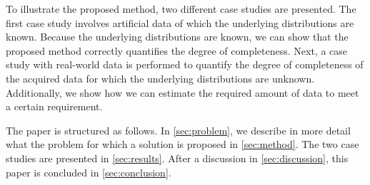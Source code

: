 To illustrate the proposed method, two different case studies are presented. The first case study involves artificial data of which the underlying distributions are known. Because the underlying distributions are known, we can show that the proposed method correctly quantifies the degree of completeness. Next, a case study with real-world data is performed to quantify the degree of completeness of the acquired data for which the underlying distributions are unknown. Additionally, we show how we can estimate the required amount of data to meet a certain requirement.

The paper is structured as follows. %
In \cref{sec:problem}, we describe in more detail what the problem for which a solution is proposed in \cref{sec:method}. The two case studies are presented in \cref{sec:results}. After a discussion in \cref{sec:discussion}, this paper is concluded in \cref{sec:conclusion}.
